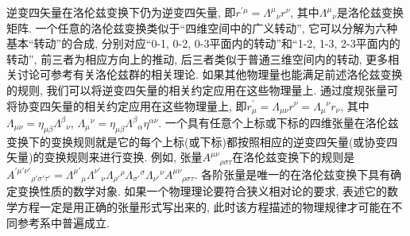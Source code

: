 逆变四矢量在洛伦兹变换下仍为逆变四矢量, 即$ r^{\prime\mu} = \varLambda^{\mu}{\!}_{\nu} r^{\nu} $, 其中$ \varLambda^{\mu}{\!}_{\nu} $是洛伦兹变换矩阵. 一个任意的洛伦兹变换类似于``四维空间中的广义转动'', 它可以分解为六种基本``转动''的合成, 分别对应``0-1, 0-2, 0-3平面内的转动''和``1-2, 1-3, 2-3平面内的转动'', 前三者为相应方向上的推动, 后三者类似于普通三维空间内的转动, 更多相关讨论可参考有关洛伦兹群的相关理论. 如果其他物理量也能满足前述洛伦兹变换的规则, 我们可以将逆变四矢量的相关约定应用在这些物理量上. 通过度规张量可将协变四矢量的相关约定应用在这些物理量上, 即$ r^{\prime}_{\mu} = \varLambda_{\mu\nu} r^{\nu} = \varLambda_{\mu}{\!}^{\nu} r_{\nu} $, 其中$ \varLambda_{\mu\nu} = \eta_{\mu\beta} \varLambda^{\beta}{\!}_{\nu} $, $ \varLambda_{\mu}{\!}^{\nu} = \eta_{\mu\beta} \varLambda^{\beta}{\!}_{\alpha} \eta^{\alpha\nu} $. 一个具有任意个上标或下标的四维张量在洛伦兹变换下的变换规则就是它的每个上标(或下标)都按照相应的逆变四矢量(或协变四矢量)的变换规则来进行变换. 例如, 张量$ A^{\mu\nu}{\!}_{\rho\sigma\tau} $在洛伦兹变换下的规则是$ A^{\prime\mu'\nu'}{\!}_{\rho'\sigma'\tau'} = \varLambda^{\mu'}{\!}_{\mu} \varLambda^{\nu'}{\!}_{\nu} \varLambda_{\rho'}{\!}^{\rho} \varLambda_{\sigma'}{\!}^{\sigma} \varLambda_{\nu'}{\!}^{\nu} A^{\mu\nu}{\!}_{\rho\sigma\tau} $. 各阶张量是唯一的在洛伦兹变换下具有确定变换性质的数学对象. 如果一个物理理论要符合狭义相对论的要求, 表述它的数学方程一定是用正确的张量形式写出来的, 此时该方程描述的物理规律才可能在不同参考系中普遍成立.

